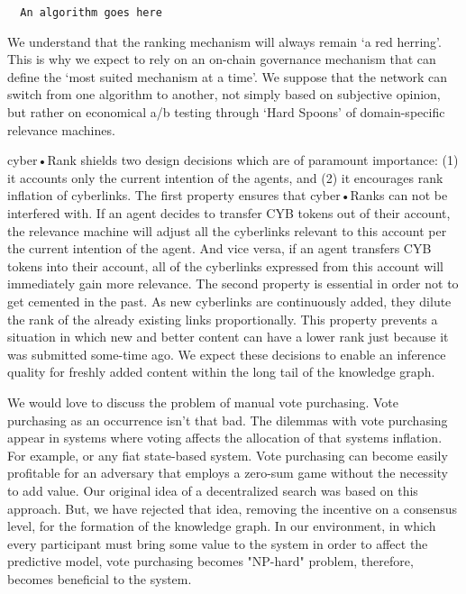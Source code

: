 \documentclass[8pt,oneside]{amsart}
\newcommand{\linkgreen}[2]{\href{#1}{\color{green}{#2}}}
\begin{document}
\begin{Abstract}
\begin{lstlisting}
  An algorithm goes here
\end{lstlisting}

We understand that the ranking mechanism will always remain ‘a red herring’. This is why we expect to rely on an on-chain governance mechanism that can define the ‘most suited mechanism at a time’. We suppose that the network can switch from one algorithm to another, not simply based on subjective opinion, but rather on economical a/b testing through ‘Hard Spoons’ of domain-specific relevance machines.

cyber•Rank shields two design decisions which are of paramount importance: (1) it accounts only the current intention of the agents, and (2) it encourages rank inflation of cyberlinks. The first property ensures that cyber•Ranks can not be interfered with. If an agent decides to transfer CYB tokens out of their account, the relevance machine will adjust all the cyberlinks relevant to this account per the current intention of the agent. And vice versa, if an agent transfers CYB tokens into their account, all of the cyberlinks expressed from this account will immediately gain more relevance. The second property is essential in order not to get cemented in the past. As new cyberlinks are continuously added, they dilute the rank of the already existing links proportionally. This property prevents a situation in which new and better content can have a lower rank just because it was submitted some-time ago. We expect these decisions to enable an inference quality for freshly added content within the long tail of the knowledge graph.

We would love to discuss the problem of manual vote purchasing. Vote purchasing as an occurrence isn't that bad. The dilemmas with vote purchasing appear in systems where voting affects the allocation of that systems inflation. For example, \linkgreen{http://ipfs.io/ipfs/QmepU77tqMAHHuiSASUvUnu8f8ENuPF2Kfs97WjLn8vAS3}{Steem}
or any fiat state-based system. Vote purchasing can become easily profitable for an adversary that employs a zero-sum game without the necessity to add value. Our original idea of a decentralized search was based on this approach. But, we have rejected that idea, removing the incentive on a consensus level, for the formation of the knowledge graph. In our environment, in which every participant must bring some value to the system in order to affect the predictive model, vote purchasing becomes "NP-hard" problem, therefore, becomes beneficial to the system.


\end{Abstract}
\end{document}
